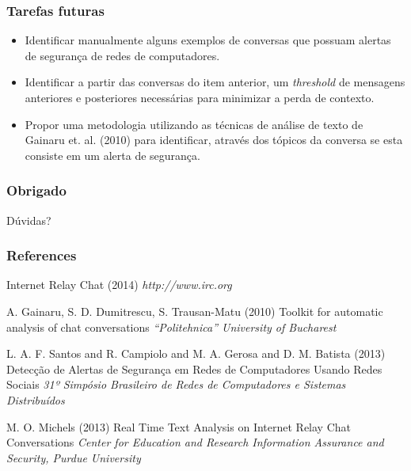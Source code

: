 \documentclass{beamer}
\begin{document}

\begin{frame}
\frametitle{Tarefas futuras}

\begin{itemize}
  \item Identificar manualmente alguns exemplos de conversas que possuam
  alertas de segurança de redes de computadores.
  \item Identificar a partir das conversas do item anterior, um
  \textit{threshold} de mensagens anteriores e posteriores necessárias
  para minimizar a perda de contexto.
  \item Propor uma metodologia utilizando as técnicas de análise de texto
  de Gainaru et. al. (2010) para identificar, através dos tópicos da conversa
  se esta consiste em um alerta de segurança.
\end{itemize}

\end{frame}


\begin{frame}
\frametitle{Obrigado}

\Huge{\centerline{Dúvidas?}}
\end{frame}


\begin{frame}
  \frametitle{References}
  \footnotesize{
  \begin{thebibliography}{99} %
     Internet Relay Chat (2014)
    \newblock \emph{http://www.irc.org}

     A. Gainaru, S. D. Dumitrescu, S. Trausan-Matu (2010)
    \newblock Toolkit for automatic analysis of chat conversations
    \newblock \emph{``Politehnica'' University of Bucharest}
    
     L. A. F. Santos and R. Campiolo and M. A. Gerosa and D. M. Batista (2013)
    \newblock Detecção de Alertas de Segurança em Redes de Computadores Usando Redes Sociais
    \newblock \emph{31º Simpósio Brasileiro de Redes de Computadores e Sistemas Distribuídos}

     M. O. Michels (2013)
    \newblock Real Time Text Analysis on Internet Relay Chat Conversations
    \newblock \emph{Center for Education and Research Information Assurance and Security, Purdue University}

  \end{thebibliography}
  }
\end{frame}

\end{document}
